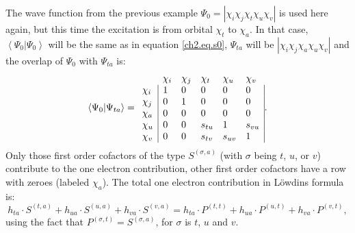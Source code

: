 The wave function from the previous example $\Psi_0 = |\chi_i\chi_j\chi_t\chi_u\chi_v|$ is used here again, but this time the excitation is from orbital $\chi_t$ to $\chi_a$. In that case, $\left< \Psi_0 | \Psi_0 \right>$ will be the same as in equation \ref{ch2.eq.s0}, $\Psi_{ta}$ will be $|\chi_i\chi_j\chi_a\chi_u\chi_v|$ and the overlap of $\Psi_0$ with $\Psi_{ta}$ is:
\begin{equation}
\left < \Psi_0 | \Psi_{ta} \right > = 
\begin{array}{llllll}
 &  \chi_i & \chi_j & \chi_t & \chi_u & \chi_v \\
 \chi_i & \multicolumn{1}{|l}{ 1 } & 0 & 0 & 0 & \multicolumn{1}{l|}{ 0 } \\
 \chi_j & \multicolumn{1}{|l}{ 0 } & 1 & 0 & 0 & \multicolumn{1}{l|}{ 0 } \\
 \chi_a & \multicolumn{1}{|l}{ 0 } & 0 & 0 & 0 & \multicolumn{1}{l|}{ 0 } \\
 \chi_u & \multicolumn{1}{|l}{ 0 } & 0 & s_{tu} & 1 & \multicolumn{1}{l|}{s_{vu}} \\
 \chi_v & \multicolumn{1}{|l}{ 0 } & 0 & s_{tv} & s_{uv} & \multicolumn{1}{l|}{1}
\end{array}.
\label{ch2.eq.psi0_ta}
\end{equation}
Only those first order cofactors of the type $S^{(\sigma,a)}$ (with $\sigma$ being $t$, $u$, or $v$) contribute to the one electron contribution, other first order cofactors have a row with zeroes (labeled $\chi_a$). The total one electron contribution in L\"{o}wdins formula is:
\begin{equation}
h_{ta} \cdot S^{(t,a)} + h_{ua} \cdot S^{(u,a)} + h_{va} \cdot S^{(v,a)} = h_{ta} \cdot P^{(t,t)} + h_{ua} \cdot P^{(u,t)} + h_{va} \cdot P^{(v,t)},
\label{ch2.eq.ta_i1}
\end{equation}
using the fact that $P^{(\sigma,t)} = S^{(\sigma,a)}$, for $\sigma$ is $t$, $u$ and $v$.

